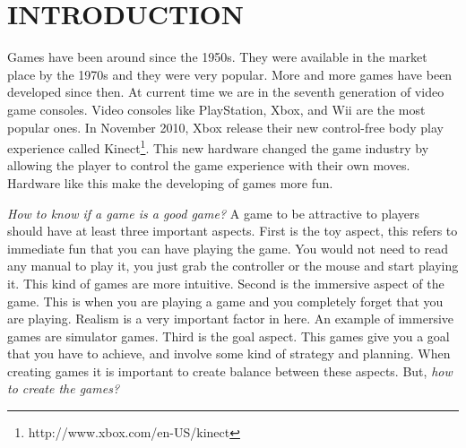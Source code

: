 \chapter{INTRODUCTION}








Games have been around since the 1950s\cite{computerVideoGamesHistory}. They were available in the market place by the 1970s and they were very popular. More and more games have been developed since then. At current time we are in the seventh generation of video game consoles\cite{seventhGenerationGames}. Video consoles like PlayStation, Xbox, and Wii are the most popular ones. In November 2010, Xbox release their new control-free body play experience called Kinect\footnote{http://www.xbox.com/en-US/kinect}. This new hardware changed the game industry by allowing the player to control the game experience with their own moves. Hardware like this make the developing of games more fun. 

\textit{How to know if a game is a good game?} A game to be attractive to players should have at least three important aspects\cite{bookGameKit2}. First is the toy aspect, this refers to immediate fun that you can have playing the game. You would not need to read any manual to play it, you just grab the controller or the mouse and start playing it. This kind of games are more intuitive. Second is the immersive aspect of the game. This is when you are playing a game and you completely forget that you are playing. Realism is a very important factor in here. An example of immersive games are simulator games. Third is the goal aspect. This games give you a goal that you have to achieve, and involve some kind of strategy and planning. When creating games it is important to create balance between these aspects. But, \textit{how to create the games?}

